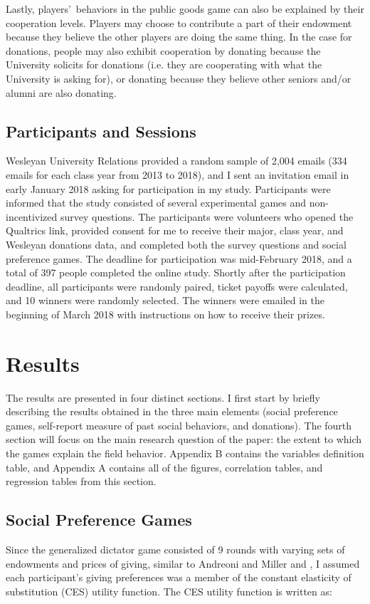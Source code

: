 \documentclass[12pt]{article}
\begin{document}
Lastly, players\rq \ behaviors in the public goods game can also be explained by their cooperation levels. Players may choose to contribute a part of their endowment because they believe the other players are doing the same thing. In the case for donations, people may also exhibit cooperation by donating because the University solicits for donations (i.e. they are cooperating with what the University is asking for), or donating because they believe other seniors and/or alumni are also donating.

	
\subsection{Participants and Sessions}

Wesleyan University Relations provided a random sample of 2,004 emails (334 emails for each class year from 2013 to 2018), and I sent an invitation email in early January 2018 asking for participation in my study. Participants were informed that the study consisted of several experimental games and non-incentivized survey questions. The participants were volunteers who opened the Qualtrics link, provided consent for me to receive their major, class year, and Wesleyan donations data, and completed both the survey questions and social preference games. The deadline for participation was mid-February 2018, and a total of 397 people completed the online study. Shortly after the participation deadline, all participants were randomly paired, ticket payoffs were calculated, and 10 winners were randomly selected. The winners were emailed  in the beginning of March 2018 with instructions on how to receive their prizes.

\section{Results}
The results are presented in four distinct sections. I first start by briefly describing the results obtained in the three main elements (social preference games, self-report measure of past social behaviors, and donations). The fourth section will focus on the main research question of the paper: the extent to which the games explain the field behavior. Appendix B contains the variables definition table, and Appendix A contains all of the figures, correlation tables, and regression tables from this section.

\subsection{Social Preference Games}
Since the generalized dictator game consisted of 9 rounds with varying sets of endowments and prices of giving, similar to Andreoni and Miller and \cite{fisman_kariv_markovits_2007}, I assumed each participant\rq s giving preferences was a member of the constant elasticity of substitution (CES) utility function.  The CES utility function is written as:\\
\end{document}
